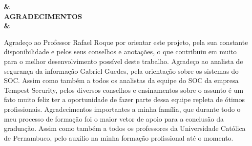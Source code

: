 \begin{acronym}
	\acro{}{}
         \acro{}{}
         \acro{}{}
\end{acronym}



\begin{texto}
\begin{center}
    \textbf{&\\AGRADECIMENTOS \\ &}
\end{center}


    Agradeço ao Professor Rafael Roque por orientar este projeto, pela sua constante disponibilidade e pelos seus conselhos e anotações, o que contribuiu em muito para o melhor desenvolvimento possível deste trabalho.
	Agradeço ao analista de segurança da informação Gabriel Guedes, pela orientação sobre os sistemas do SOC. Assim como também a todos os analistas da equipe do SOC da empresa Tempest Security, pelos diversos conselhos e ensinamentos sobre o assunto é um fato muito feliz ter a oportunidade de fazer parte dessa equipe repleta de ótimos profissionais. 
	Agradecimentos importantes a minha família, que durante todo o meu processo de formação foi o maior vetor de apoio para a conclusão da graduação. Assim como também a todos os professores da Universidade Católica de Pernambuco, pelo auxílio na minha formação profissional até o momento.
\end{texto}
  	


